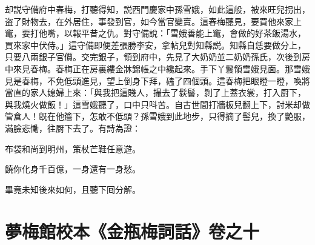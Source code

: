 却説守備府中春梅，打聽得知，説西門慶家中孫雪娥，如此這般，被來旺兒拐出，盗了財物去，在外居住，事發到官，如今當官變賣。這春梅聽見，要買他來家上竃，要打他嘴，以報平昔之仇。對守備說：「雪娥善能上竃，會做的好茶飯湯水，買來家中伏侍。」這守備即便差張勝李安，拿帖兒對知縣説。知縣自恁要做分上，只要八兩銀子官價。交完銀子，領到府中，先見了大奶奶並二奶奶孫氏，次後到房中來見春梅。春梅正在房裏縷金牀錦帳之中纔起來。手下丫鬟領雪娥見面。那雪娥見是春梅，不免低頭進見，望上倒身下拜，磕了四個頭。這春梅把眼瞪一瞪，喚將當直的家人媳婦上來：「與我把這賤人，撮去了䯼髻，剝了上蓋衣裳，打入厨下，與我燒火做飯！」這雪娥聽了，口中只呌苦。自古世間打牆板兒翻上下，討米却做管倉人！旣在他簷下，怎敢不低頭？孫雪娥到此地步，只得摘了髻兒，換了艷服，滿臉悲慟，往厨下去了。有詩為證：

\begin{myquote}
布袋和尚到明州，策杖芒鞋任意遊。

饒你化身千百億，一身還有一身愁。
\end{myquote}

畢竟未知後來如何，且聽下囘分解。

\part*{夢梅館校本《金瓶梅詞話》卷之十}

